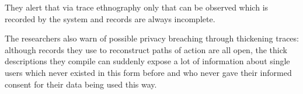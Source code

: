 They alert that via trace ethnography only that can be observed which is recorded by the system and records are always incomplete.

The researchers also warn of possible privacy breaching through thickening traces:
although records they use to reconstruct paths of action are all open, the thick descriptions they compile can suddenly expose a lot of information about single users which never existed in this form before and who never gave their informed consent for their data being used this way.

\begin{comment}

\cite{GeiHal2017}
"when working with large-scale “found data” [36] of the traces
users leave behind when interacting on a platform, how do we best operationalize culturally-specific
concepts like conflict in a way that aligns with the particular context in which those traces were made?"

Star: "ethnography of infrastructure":
"discusses the “veridical” approach, in which “the information system
is taken unproblematically as a mirror of actions in the world, and often tacitly, as a complete
enough record of those actions” (p. 388).
She contrasts this with seeing the data as “a trace or record
of activities,” in which the information infrastructure “sits (often uneasily) somewhere between
research assistant to the investigator and found cultural artifact."

"Trace
ethnography is not “lurker ethnography” done by someone who never interviews or participates in
a community."
trace literacy --> get to know the community; know how to participate in it

thick description of different prototypical cases:

vgl \cite{GeiHal2017}
iterative mixed method
combination of:
* quantitative methods: mining big data sets/computational social science
"begin with one or
more large (but often thin) datasets generated by a software platform, which has recorded digital
traces that users leave in interacting on that platform. Such researchers then seek to mine as much
signal and significance from these found datasets as they can at scale in order to answer a research
question"
* more traditional social science/qualitative methods, e.g. interviews, observations, experiments
\end{comment}

